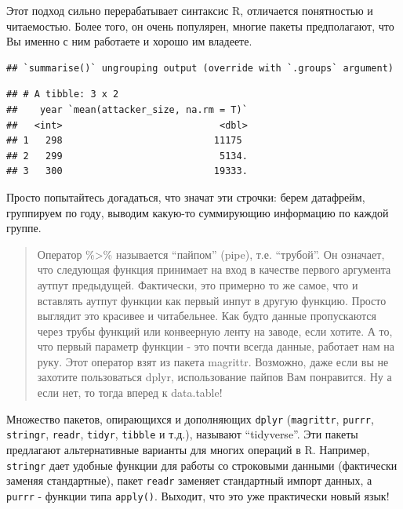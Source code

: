 \documentclass[]{book}
\newenvironment{Shaded}{\begin{snugshade}}{\end{snugshade}}
\newcommand{\KeywordTok}[1]{\textcolor[rgb]{0.13,0.29,0.53}{\textbf{#1}}}
\newcommand{\DataTypeTok}[1]{\textcolor[rgb]{0.13,0.29,0.53}{#1}}
\newcommand{\StringTok}[1]{\textcolor[rgb]{0.31,0.60,0.02}{#1}}
\newcommand{\OperatorTok}[1]{\textcolor[rgb]{0.81,0.36,0.00}{\textbf{#1}}}
\newcommand{\NormalTok}[1]{#1}
\begin{document}
Этот подход сильно перерабатывает синтаксис R, отличается понятностью и
читаемостью. Более того, он очень популярен, многие пакеты предполагают,
что Вы именно с ним работаете и хорошо им владеете.

\begin{Shaded}
\end{Shaded}

\begin{verbatim}
## `summarise()` ungrouping output (override with `.groups` argument)
\end{verbatim}

\begin{verbatim}
## # A tibble: 3 x 2
##    year `mean(attacker_size, na.rm = T)`
##   <int>                            <dbl>
## 1   298                           11175 
## 2   299                            5134.
## 3   300                           19333.
\end{verbatim}

Просто попытайтесь догадаться, что значат эти строчки: берем датафрейм,
группируем по году, выводим какую-то суммирующию информацию по каждой
группе.

\begin{quote}
Оператор \%\textgreater{}\% называется ``пайпом'' (pipe), т.е.
``трубой''. Он означает, что следующая функция принимает на вход в
качестве первого аргумента аутпут предыдущей. Фактически, это примерно
то же самое, что и вставлять аутпут функции как первый инпут в другую
функцию. Просто выглядит это красивее и читабельнее. Как будто данные
пропускаются через трубы функций или конвеерную ленту на заводе, если
хотите. А то, что первый параметр функции - это почти всегда данные,
работает нам на руку. Этот оператор взят из пакета magrittr. Возможно,
даже если вы не захотите пользоваться dplyr, использование пайпов Вам
понравится. Ну а если нет, то тогда вперед к data.table!
\end{quote}

Множество пакетов, опирающихся и дополняющих \texttt{dplyr}
(\texttt{magrittr}, \texttt{purrr}, \texttt{stringr}, \texttt{readr},
\texttt{tidyr}, \texttt{tibble} и т.д.), называют ``tidyverse''. Эти
пакеты предлагают альтернативные варианты для многих операций в R.
Например, \texttt{stringr} дает удобные функции для работы со строковыми
данными (фактически заменяя стандартные), пакет \texttt{readr} заменяет
стандартный импорт данных, а \texttt{purrr} - функции типа
\texttt{apply()}. Выходит, что это уже практически новый язык!
\end{document}
